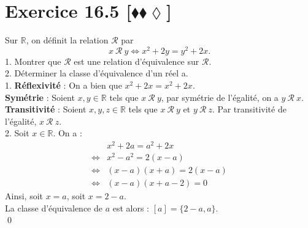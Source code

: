 \documentclass[10pt]{article}
\begin{document}
\section*{Exercice 16.5 [$\blacklozenge\blacklozenge\lozenge$]}
\begin{tcolorbox}[enhanced, width=7.6in, center, size=fbox, fontupper=\large, drop shadow southwest]
    Sur $\mathbb{R}$, on définit la relation $\mathcal{R}$ par
    \begin{equation*}
        x~\mathcal{R}~y \iff x^2 + 2y = y^2 + 2x.
    \end{equation*}
    1. Montrer que $\mathcal{R}$ est une relation d'équivalence sur $\mathcal{R}$.\\
    2. Déterminer la classe d'équivalence d'un réel a.\\[0.15cm]
    1. \textbf{Réflexivité} : On a bien que $x^2 + 2x = x^2 + 2x$.\\
    \textbf{Symétrie} : Soient $x,y\in\mathbb{R}$ tels que $x~\mathcal{R}~y$, par symétrie de l'égalité, on a $y~\mathcal{R}~x$.\\
    \textbf{Transitivité} : Soient $x,y,z\in\mathbb{R}$ tels que $x~\mathcal{R}~y$ et $y~\mathcal{R}~z$. Par transitivité de l'égalité, $x~\mathcal{R}~z$.\\[0.15cm]
    2. Soit $x\in\mathbb{R}$. On a :
    \begin{align*}
        &x^2 + 2a = a^2 + 2x\\
        \iff&x^2 - a^2 = 2(x-a)\\
        \iff&(x-a)(x+a)=2(x-a)\\
        \iff&(x-a)(x+a-2)=0
    \end{align*}
    Ainsi, soit $x=a$, soit $x=2-a$.\\
    La classe d'équivalence de $a$ est alors : $[a]=\{2-a,a\}$.\\
    \qed
\end{tcolorbox}
\end{document}
